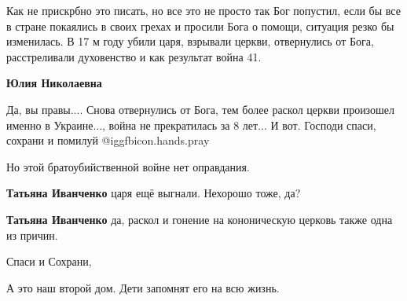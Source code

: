 \begin{itemize}

Как не прискрбно это писать, но все это не просто так Бог попустил, если бы все
в стране покаялись в своих грехах и просили Бога о помощи, ситуация резко бы
изменилась. В 17 м году убили царя, взрывали церкви, отвернулись от Бога,
расстреливали духовенство и как результат война 41.

\begin{itemize} %
\textbf{Юлия Николаевна} 

Да, вы правы.... Снова отвернулись от Бога, тем более раскол церкви произошел
именно в Украине..., война не прекратилась за 8 лет... И вот. Господи спаси,
сохрани и помилуй @igg{fbicon.hands.pray} 

Но этой братоубийственной войне нет оправдания.

\textbf{Татьяна Иванченко} царя ещё выгнали. Нехорошо тоже, да?

\textbf{Татьяна Иванченко} да, раскол и гонение на кононическую церковь также одна из причин.
\end{itemize} %

Спаси и Сохрани,

А это наш второй дом. Дети запомнят его на всю жизнь.

\end{itemize} %
